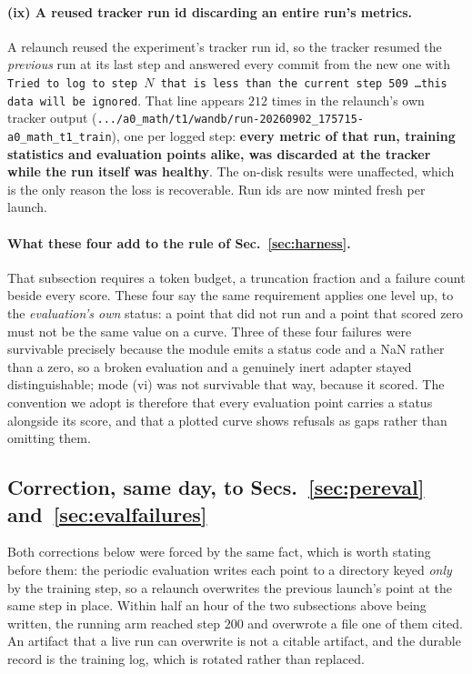 \paragraph{(ix) A reused tracker run id discarding an entire run's metrics.} A relaunch
reused the experiment's tracker run id, so the tracker resumed the \emph{previous} run at its
last step and answered every commit from the new one with \texttt{Tried to log to step $N$
that is less than the current step 509 \ldots this data will be ignored}. That line appears
$212$ times in the relaunch's own tracker output
(\texttt{.../a0\_math/t1/wandb/run-20260902\_175715-a0\_math\_t1\_train}),
one per logged step: \textbf{every metric of that run, training statistics and evaluation
points alike, was discarded at the tracker while the run itself was healthy}. The on-disk
results were unaffected, which is the only reason the loss is recoverable. Run ids are now
minted fresh per launch.

\paragraph{What these four add to the rule of Sec.~\ref{sec:harness}.} That subsection requires
a token budget, a truncation fraction and a failure count beside every score. These four say
the same requirement applies one level up, to the \emph{evaluation's own} status: a point that
did not run and a point that scored zero must not be the same value on a curve. Three of these
four failures were survivable precisely because the module emits a status code and a NaN
rather than a zero, so a broken evaluation and a genuinely inert adapter stayed
distinguishable; mode (vi) was not survivable that way, because it scored. The convention we
adopt is therefore that every evaluation point carries a status alongside its score, and that
a plotted curve shows refusals as gaps rather than omitting them.

\subsection{Correction, same day, to Secs.~\ref{sec:pereval} and~\ref{sec:evalfailures}}
\label{sec:perevalfix}

Both corrections below were forced by the same fact, which is worth stating before them: the
periodic evaluation writes each point to a directory keyed \emph{only} by the training step, so
a relaunch overwrites the previous launch's point at the same step in place. Within half an
hour of the two subsections above being written, the running arm reached step $200$ and
overwrote a file one of them cited. An artifact that a live run can overwrite is not a citable
artifact, and the durable record is the training log, which is rotated rather than replaced.

